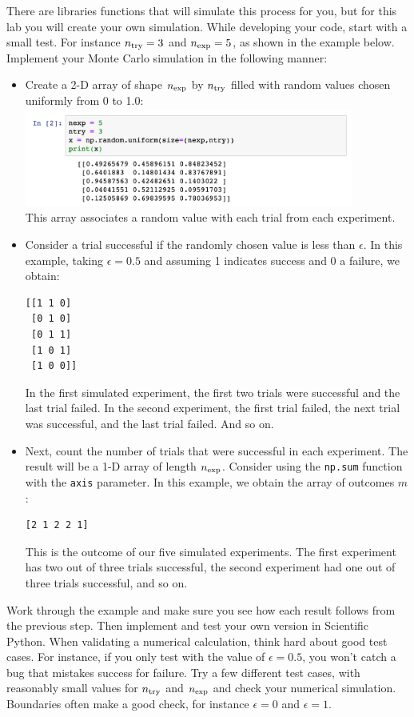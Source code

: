 There are libraries functions that will simulate this process for you,
but for this lab you will create your own simulation.  While
developing your code, start with a small test. For instance $n_{\rm
  try} = 3$ and $n_{\rm exp}=5$, as shown in the example below.
Implement your Monte Carlo simulation in the following manner:
\begin{itemize}
\item Create a 2-D array of shape $n_{\rm exp}$ by $n_{\rm try}$
  filled with random values chosen uniformly from 0 to 1.0:\\
\includegraphics[width=0.85\textwidth]{figs/labs/distributions/makearray.png} \\
This array associates a random value with each trial from each
experiment.  
\item Consider a trial successful if the randomly chosen value is less
  than $\epsilon$.  In this example, taking $\epsilon = 0.5$ and
  assuming 1 indicates success and 0 a failure, we obtain:
\begin{samepage}
\begin{verbatim}
[[1 1 0]
 [0 1 0]
 [0 1 1]
 [1 0 1]
 [1 0 0]]
\end{verbatim}
\end{samepage}
In the first simulated experiment, the first two trials were
successful and the last trial failed.  In the second experiment, the
first trial failed, the next trial was successful, and the last trial
failed.  And so on.

\item Next, count the number of trials that were successful in each experiment.  The result will be a 1-D array of length $n_{\rm exp}$.  Consider using the {\tt np.sum} function with the {\tt axis} parameter.  In this example, we obtain the array of outcomes $m$:
\begin{verbatim} 
[2 1 2 2 1]
\end{verbatim}
This is the outcome of our five simulated experiments.  The first
experiment has two out of three trials successful, the second
experiment had one out of three trials successful, and so on.
\end{itemize} 
Work through the example and make sure you see how each result follows
from the previous step.  Then implement and test your own version in
Scientific Python.  When validating a numerical calculation, think hard
about good test cases.  For instance, if you only test with the value
of $\epsilon = 0.5$, you won't catch a bug that mistakes success for
failure.  Try a few different test cases, with reasonably small values
for $n_{\rm try}$ and $n_{\rm exp}$ and check your numerical
simulation.  Boundaries often make a good check, for instance
$\epsilon = 0$ and $\epsilon = 1$.

